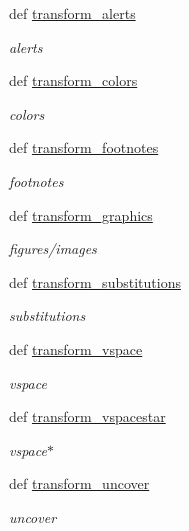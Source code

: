 \begin{DoxyCompactItemize}
def \hyperlink{namespaceuicilibris_1_1transform_a2fc9a6c122cbc1b999a471477a64fb62}{transform\-\_\-alerts}
\begin{DoxyCompactList}\small\item\em alerts \end{DoxyCompactList}\item 
def \hyperlink{namespaceuicilibris_1_1transform_a00c2a9e039c34057f476d761315acfa6}{transform\-\_\-colors}
\begin{DoxyCompactList}\small\item\em colors \end{DoxyCompactList}\item 
def \hyperlink{namespaceuicilibris_1_1transform_ac45e3973b902e7c02e246047e18ae905}{transform\-\_\-footnotes}
\begin{DoxyCompactList}\small\item\em footnotes \end{DoxyCompactList}\item 
def \hyperlink{namespaceuicilibris_1_1transform_ab8faf91922cc5d59a8514e6acce5075c}{transform\-\_\-graphics}
\begin{DoxyCompactList}\small\item\em figures/images \end{DoxyCompactList}\item 
def \hyperlink{namespaceuicilibris_1_1transform_a5fb61a8d93475412b207f587a48e80ce}{transform\-\_\-substitutions}
\begin{DoxyCompactList}\small\item\em substitutions \end{DoxyCompactList}\item 
def \hyperlink{namespaceuicilibris_1_1transform_a8adcacf533db438a70c9651e3a2e7ec4}{transform\-\_\-vspace}
\begin{DoxyCompactList}\small\item\em vspace \end{DoxyCompactList}\item 
def \hyperlink{namespaceuicilibris_1_1transform_af4f92cee8930d07dfc60315e76f03731}{transform\-\_\-vspacestar}
\begin{DoxyCompactList}\small\item\em vspace$\ast$ \end{DoxyCompactList}\item 
def \hyperlink{namespaceuicilibris_1_1transform_a52daa3a244158c52fd57576e9a69ef41}{transform\-\_\-uncover}
\begin{DoxyCompactList}\small\item\em uncover \end{DoxyCompactList}\item 

\end{DoxyCompactItemize}
